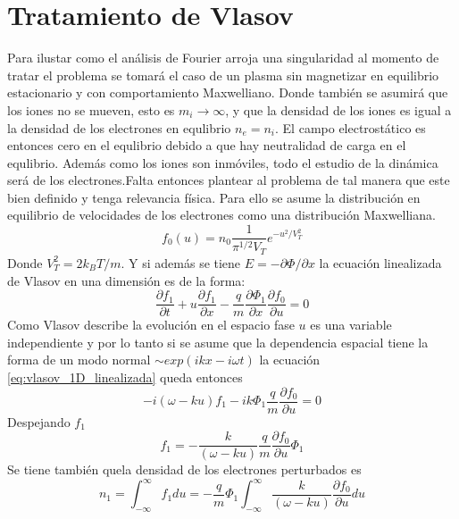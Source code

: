\documentclass[../tesis_main_file.tex]{subfile}
\begin{document}
\section{Tratamiento de Vlasov}
Para ilustar como el análisis de Fourier arroja una singularidad al momento de tratar el problema se tomará el caso de un plasma sin magnetizar en equilibrio estacionario y con comportamiento Maxwelliano. Donde también se asumirá que los iones no se mueven, esto es $m_i \to \infty$, y que la densidad de los iones es igual a la densidad de los electrones en equlibrio $n_e =n_i$. El campo electrostático es entonces cero en el equlibrio debido a que hay neutralidad de carga en el equlibrio. Además como los iones son inmóviles, todo el estudio de la dinámica será de los electrones.Falta entonces plantear al problema de tal manera que este bien definido y tenga relevancia física. Para ello se asume la distribución en equilibrio de velocidades de los electrones como una distribución Maxwelliana.
\begin{equation}
\label{eq:fourier_distribucion_maxwelliana}
f_0(u)=n_0\frac{1}{\pi^{1/2}V_T}e^{-u^2/V_T^2}
\end{equation}
Donde $V_T^2=2k_BT/m$. Y si además se tiene $E=- \partial \Phi/\partial x$ la ecuación linealizada de Vlasov en una dimensión es de la forma:
\begin{equation}
\label{eq:vlasov_1D_linealizada}
\frac{\partial f_1}{\partial t}+u\frac{\partial f_1}{\partial x}-\frac{q}{m}\frac{\partial \Phi _1}{\partial x}\frac{\partial f_0}{\partial u}=0
\end{equation}
Como Vlasov describe la evolución en el espacio fase $u$ es una variable independiente y por lo tanto si se asume que la dependencia espacial tiene la forma de un modo normal $\sim exp(ikx-i\omega t)$ la ecuación \ref{eq:vlasov_1D_linealizada} queda entonces
\begin{equation}
-i(\omega-ku)f_1- ik\Phi _1 \frac{q}{m}\frac{\partial f_0}{\partial u}=0
\end{equation}
Despejando $f_1$
\begin{equation}
f_1 =-\frac{k}{(\omega -ku)}\frac{q}{m}\frac{\partial f_0}{\partial u}\Phi_1
\end{equation}
Se tiene también quela densidad de los electrones perturbados es
\begin{equation}
\label{eq:densidad_electrones_perturbados}
n_1 = \int^{\infty}_{-\infty} f_1 du=-\frac{q}{m}\Phi_1 \int^{\infty}_{-\infty}\frac{k}{(\omega-ku)}\frac{\partial f_0}{\partial u}du
\end{equation}
\end{document}
